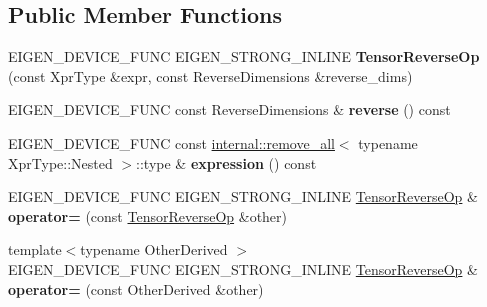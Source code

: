 \subsection*{Public Member Functions}
\begin{DoxyCompactItemize}
\item 
\mbox{\label{class_eigen_1_1_tensor_reverse_op_af5bfe32e954777f5f52af576c122ce45}} 
E\+I\+G\+E\+N\+\_\+\+D\+E\+V\+I\+C\+E\+\_\+\+F\+U\+NC E\+I\+G\+E\+N\+\_\+\+S\+T\+R\+O\+N\+G\+\_\+\+I\+N\+L\+I\+NE {\bfseries Tensor\+Reverse\+Op} (const Xpr\+Type \&expr, const Reverse\+Dimensions \&reverse\+\_\+dims)
\item 
\mbox{\label{class_eigen_1_1_tensor_reverse_op_ad756c4a835eca6c47a3a65b0e1fd6f81}} 
E\+I\+G\+E\+N\+\_\+\+D\+E\+V\+I\+C\+E\+\_\+\+F\+U\+NC const Reverse\+Dimensions \& {\bfseries reverse} () const
\item 
\mbox{\label{class_eigen_1_1_tensor_reverse_op_a400eddf4cfaafe3916e21e6cf1e50932}} 
E\+I\+G\+E\+N\+\_\+\+D\+E\+V\+I\+C\+E\+\_\+\+F\+U\+NC const \hyperlink{struct_eigen_1_1internal_1_1remove__all}{internal\+::remove\+\_\+all}$<$ typename Xpr\+Type\+::\+Nested $>$\+::type \& {\bfseries expression} () const
\item 
\mbox{\label{class_eigen_1_1_tensor_reverse_op_a364a93315bf7ededd0b9df82242cc75c}} 
E\+I\+G\+E\+N\+\_\+\+D\+E\+V\+I\+C\+E\+\_\+\+F\+U\+NC E\+I\+G\+E\+N\+\_\+\+S\+T\+R\+O\+N\+G\+\_\+\+I\+N\+L\+I\+NE \hyperlink{class_eigen_1_1_tensor_reverse_op}{Tensor\+Reverse\+Op} \& {\bfseries operator=} (const \hyperlink{class_eigen_1_1_tensor_reverse_op}{Tensor\+Reverse\+Op} \&other)
\item 
\mbox{\label{class_eigen_1_1_tensor_reverse_op_a3b404543d64d84a0974593bfa946a0e1}} 
{\footnotesize template$<$typename Other\+Derived $>$ }\\E\+I\+G\+E\+N\+\_\+\+D\+E\+V\+I\+C\+E\+\_\+\+F\+U\+NC E\+I\+G\+E\+N\+\_\+\+S\+T\+R\+O\+N\+G\+\_\+\+I\+N\+L\+I\+NE \hyperlink{class_eigen_1_1_tensor_reverse_op}{Tensor\+Reverse\+Op} \& {\bfseries operator=} (const Other\+Derived \&other)
\item 
\mbox{\label{class_eigen_1_1_tensor_reverse_op_af5bfe32e954777f5f52af576c122ce45}} 

\end{DoxyCompactItemize}
